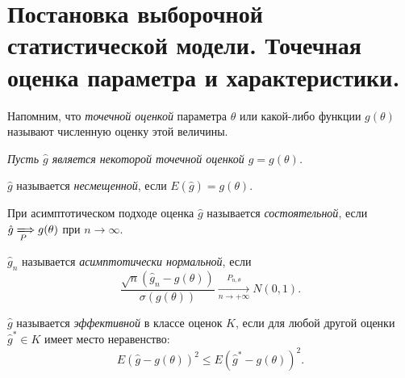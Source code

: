 \section{Постановка выборочной статистической модели. Точечная оценка параметра
  и характеристики.}

\begin{definition}
	Напомним, что \textit{точечной оценкой} параметра $\theta$ или какой-либо
	функции $g(\theta)$ называют численную оценку этой величины.
\end{definition}

\textit{Пусть $\hat{g}$ является некоторой точечной оценкой $g = g(\theta)$.}

\begin{definition}
	$\hat{g}$ называется \textit{несмещенной}, если $E(\hat{g}) = g(\theta).$
\end{definition}

\begin{definition}
	При асимптотическом подходе оценка $\hat{g}$ называется 
    \textit{состоятельной}, если $\hat{g} \xLongrightarrow[P]{} g(\theta)$ при 
    $n \to \infty$.
\end{definition}

\begin{definition}
	$\hat{g}_n$ называется \textit{асимптотически нормальной}, если
	\[
		\frac{\sqrt{n}(\hat{g}_n - g(\theta))}{\sigma(g(\theta))}
        \xrightarrow[n \to +\infty]{P_{n, \theta}} N(0, 1)
	.\]
\end{definition}

\begin{definition}
	$\hat{g}$ называется \textit{эффективной} в классе оценок $K$, если для
	любой другой оценки $\hat{g}^* \in K$ имеет место неравенство:
	\[
		E(\hat{g} - g(\theta))^2 \leqslant E(\hat{g}^* - g(\theta))^2
	.\]
\end{definition}

